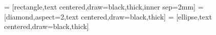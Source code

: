 


\usetikzlibrary{er}



 = [rectangle,text centered,draw=black,thick,inner sep=2mm]
 = [diamond,aspect=2,text centered,draw=black,thick]
 = [ellipse,text centered,draw=black,thick]
\newcommand{\primarykey}[1]{\underline{#1}}
\newcommand{\foreignkey}[1]{\ifmodulgeladen{icons}{\faLongArrowAltUp}{\uparrow}\,#1}
